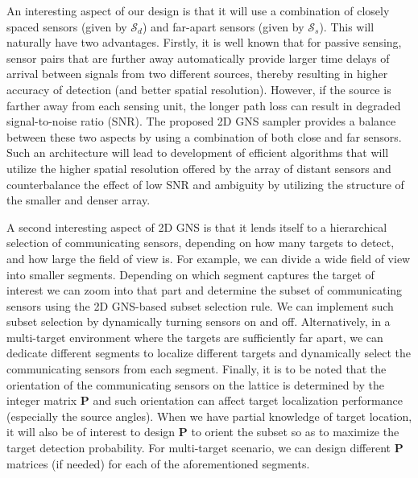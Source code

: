 An interesting aspect of our design is that it will use a combination of closely spaced sensors (given by $\mathcal{S}_d$) and far-apart sensors (given by $\mathcal{S}_s$). This will naturally have two advantages. 
Firstly,  it is well known that for passive sensing, sensor pairs that are further away automatically provide larger time delays of arrival between signals from two different sources, thereby resulting in higher accuracy of detection (and better spatial resolution). However, if the source is farther away from each sensing unit, the longer path loss can result in degraded signal-to-noise ratio (SNR). The proposed 2D GNS sampler provides a balance between these two aspects by using a combination of both close and far sensors. Such an architecture will lead to development of efficient algorithms that will utilize the higher spatial resolution offered by the array of distant sensors and counterbalance the effect of low SNR and ambiguity by utilizing the structure of the smaller and denser array. 

A second interesting aspect of 2D GNS is that it lends itself to a hierarchical selection of communicating sensors, depending on how many targets to detect, and how large the field of view is. For example, we can divide a wide field of view into smaller segments. Depending on which segment captures the target of interest 
we can zoom into that part and determine the subset of communicating sensors using the 2D GNS-based subset selection rule. We can implement such subset selection by dynamically turning sensors on and off. Alternatively, in a multi-target environment where the targets are sufficiently far apart, we can dedicate different segments to localize different targets and dynamically select the communicating sensors from each segment. Finally, it is to be noted that the orientation of the communicating sensors on the lattice is determined by the integer matrix $\mathbf{P}$ and such orientation can affect target localization performance (especially the source angles). When we have partial knowledge of target location, it will also be of interest to design $\mathbf{P}$ to orient the subset so as to maximize the target detection probability. For multi-target scenario, we can design different $\mathbf{P}$ matrices (if needed) for each of the aforementioned segments.



